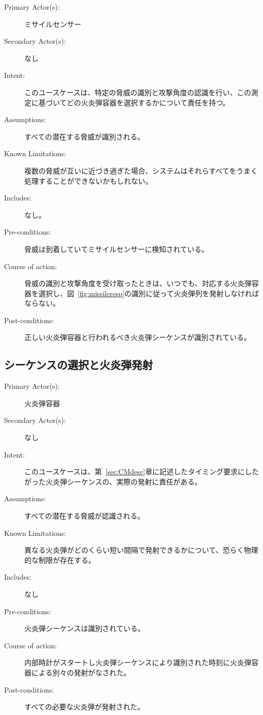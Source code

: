 \documentclass[\pformat,12pt]{jreport}
\begin{document}
\begin{description}
\item[Primary Actor(s):] ミサイルセンサー
\item[Secondary Actor(s):] なし
\item[Intent:] このユースケースは、特定の脅威の識別と攻撃角度の認識を行い、この測定に基づいてどの火炎弾容器を選択するかについて責任を持つ。
\item[Assumptions:] すべての潜在する脅威が識別される。
\item[Known Limitations:] 複数の脅威が互いに近づき過ぎた場合、システムはそれらすべてをうまく処理することができないかもしれない。
\item[Includes:] なし。
\item[Pre-conditions:] 脅威は到着していてミサイルセンサーに検知されている。
\item[Course of action:] 脅威の識別と攻撃角度を受け取ったときは、いつでも、対応する火炎弾容器を選択し、図~\ref{fig:missileresp}の識別に従って火炎弾列を発射しなければならない。
\item[Post-conditions:] 正しい火炎弾容器と行われるべき火炎弾シーケンスが識別されている。
\end{description}

\subsection{シーケンスの選択と火炎弾発射}

\begin{description}
\item[Primary Actor(s):] 火炎弾容器
\item[Secondary Actor(s):] なし
\item[Intent:] このユースケースは、第~\ref{sec:CMdesc}章に記述したタイミング要求にしたがった火炎弾シーケンスの、実際の発射に責任がある。
\item[Assumptions:] すべての潜在する脅威が認識される。
\item[Known Limitations:] 異なる火炎弾がどのくらい短い間隔で発射できるかについて、恐らく物理的な制限が存在する。
\item[Includes:] なし
\item[Pre-conditions:] 火炎弾シーケンスは識別されている。
\item[Course of action:] 内部時計がスタートし火炎弾シーケンスにより識別された時刻に火炎弾容器による別々の発射がなされた。
\item[Post-conditions:] すべての必要な火炎弾が発射された。
\end{description}
\end{document}

